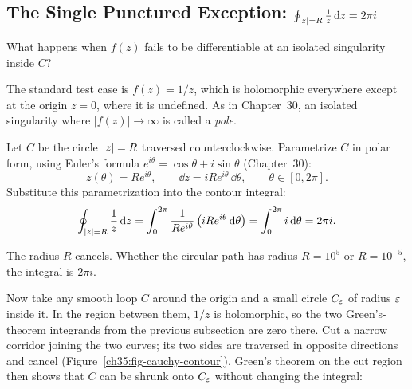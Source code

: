 \subsection{The Single Punctured Exception: \texorpdfstring{$\oint_{\lvert z\rvert=R} \frac{1}{z}\,\mathrm{d} z = 2\pi i$}{The Contour Integral of 1/z}}

What happens when $f(z)$ fails to be differentiable at an isolated singularity inside $C$?

The standard test case is $f(z) = 1/z$, which is holomorphic everywhere except at the origin $z = 0$, where it is undefined. As in Chapter~30, an isolated singularity where $|f(z)| \to \infty$ is called a \emph{pole}.

Let $C$ be the circle $\lvert z\rvert = R$ traversed counterclockwise. Parametrize $C$ in polar form, using Euler's formula $e^{i\theta} = \cos\theta + i\sin\theta$ (Chapter~30):
\[
z(\theta) = R e^{i\theta}, \qquad \dd z = i R e^{i\theta}\,\dd\theta, \qquad \theta \in [0, 2\pi].
\]
Substitute this parametrization into the contour integral:
\begin{equation}
\oint_{\lvert z\rvert=R} \frac{1}{z}\,\mathrm{d} z = \int_0^{2\pi} \frac{1}{R e^{i\theta}} \left(i R e^{i\theta}\,\mathrm{d}\theta\right) = \int_0^{2\pi} i\,\mathrm{d}\theta = 2\pi i.
\label{ch35:eq-1-over-z}
\end{equation}

The radius $R$ cancels. Whether the circular path has radius $R = 10^5$ or $R = 10^{-5}$, the integral is $2\pi i$.

Now take any smooth loop $C$ around the origin and a small circle $C_\varepsilon$ of radius $\varepsilon$ inside it. In the region between them, $1/z$ is holomorphic, so the two Green's-theorem integrands from the previous subsection are zero there. Cut a narrow corridor joining the two curves; its two sides are traversed in opposite directions and cancel (Figure~\ref{ch35:fig-cauchy-contour}). Green's theorem on the cut region then shows that $C$ can be shrunk onto $C_\varepsilon$ without changing the integral:

